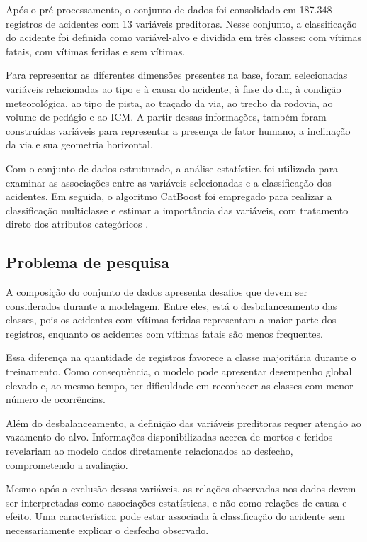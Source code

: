 \documentclass[12pt]{article}
\begin{document}
Após o pré-processamento, o conjunto de dados foi consolidado em 187.348 registros de acidentes com 13 variáveis preditoras. Nesse conjunto, a classificação do acidente foi definida como variável-alvo e dividida em três classes: com vítimas fatais, com vítimas feridas e sem vítimas.

Para representar as diferentes dimensões presentes na base, foram selecionadas variáveis relacionadas ao tipo e à causa do acidente, à fase do dia, à condição meteorológica, ao tipo de pista, ao traçado da via, ao trecho da rodovia, ao volume de pedágio e ao ICM. A partir dessas informações, também foram construídas variáveis para representar a presença de fator humano, a inclinação da via e sua geometria horizontal.

Com o conjunto de dados estruturado, a análise estatística foi utilizada para examinar as associações entre as variáveis selecionadas e a classificação dos acidentes. Em seguida, o algoritmo CatBoost foi empregado para realizar a classificação multiclasse e estimar a importância das variáveis, com tratamento direto dos atributos categóricos \cite{prokhorenkova2018catboost}.

\subsection{Problema de pesquisa}

A composição do conjunto de dados apresenta desafios que devem ser considerados durante a modelagem. Entre eles, está o desbalanceamento das classes, pois os acidentes com vítimas feridas representam a maior parte dos registros, enquanto os acidentes com vítimas fatais são menos frequentes.

Essa diferença na quantidade de registros favorece a classe majoritária durante o treinamento. Como consequência, o modelo pode apresentar desempenho global elevado e, ao mesmo tempo, ter dificuldade em reconhecer as classes com menor número de ocorrências.

Além do desbalanceamento, a definição das variáveis preditoras requer atenção ao vazamento do alvo. Informações disponibilizadas acerca de mortos e feridos revelariam ao modelo dados diretamente relacionados ao desfecho, comprometendo a avaliação.

Mesmo após a exclusão dessas variáveis, as relações observadas nos dados devem ser interpretadas como associações estatísticas, e não como relações de causa e efeito. Uma característica pode estar associada à classificação do acidente sem necessariamente explicar o desfecho observado.
\end{document}
